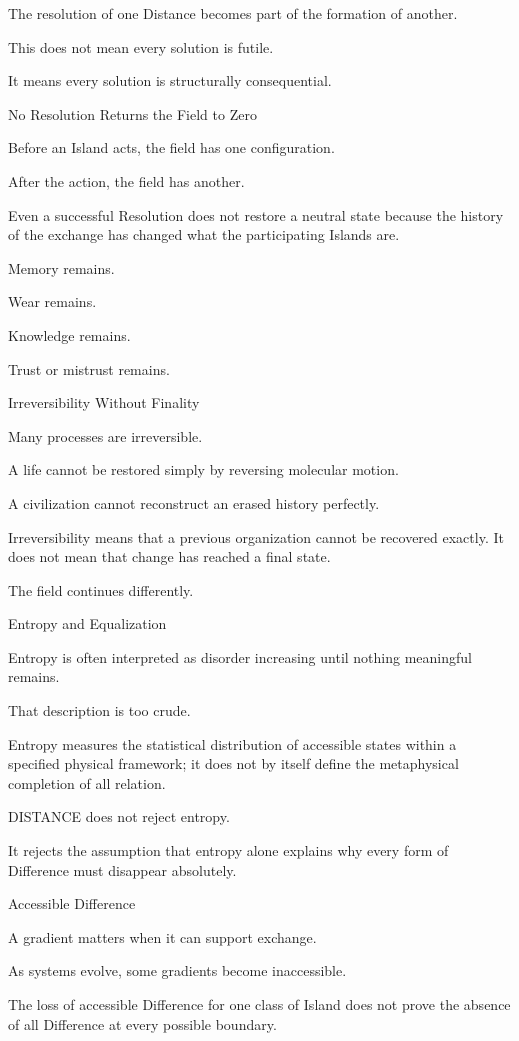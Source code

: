 The resolution of one Distance becomes part of the formation of another.

This does not mean every solution is futile.

It means every solution is structurally consequential.

No Resolution Returns the Field to Zero

Before an Island acts, the field has one configuration.

After the action, the field has another.

Even a successful Resolution does not restore a neutral state because the history of the exchange has changed what the participating Islands are.

Memory remains.

Wear remains.

Knowledge remains.

Trust or mistrust remains.

Irreversibility Without Finality

Many processes are irreversible.

A life cannot be restored simply by reversing molecular motion.

A civilization cannot reconstruct an erased history perfectly.

Irreversibility means that a previous organization cannot be recovered exactly. It does not mean that change has reached a final state.

The field continues differently.

Entropy and Equalization

Entropy is often interpreted as disorder increasing until nothing meaningful remains.

That description is too crude.

Entropy measures the statistical distribution of accessible states within a specified physical framework; it does not by itself define the metaphysical completion of all relation.

DISTANCE does not reject entropy.

It rejects the assumption that entropy alone explains why every form of Difference must disappear absolutely.

Accessible Difference

A gradient matters when it can support exchange.

As systems evolve, some gradients become inaccessible.

The loss of accessible Difference for one class of Island does not prove the absence of all Difference at every possible boundary.

